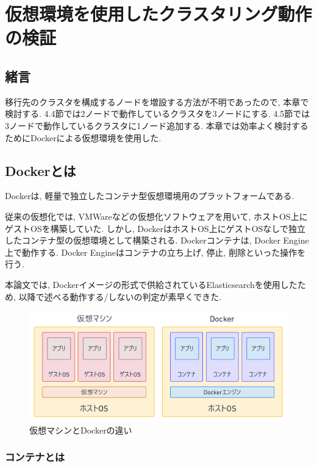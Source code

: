 \chapter{仮想環境を使用したクラスタリング動作の検証}
\label{chap:fourth}

\section{緒言}
移行先のクラスタを構成するノードを増設する方法が不明であったので, 本章で検討する. 4.4節では2ノードで動作しているクラスタを3ノードにする. 4.5節では3ノードで動作しているクラスタに1ノード追加する. 本章では効率よく検討するためにDockerによる仮想環境を使用した.

\section{Dockerとは}
Dockerは, 軽量で独立したコンテナ型仮想環境用のプラットフォームである\cite {4}.

従来の仮想化では, VMWare\cite {5}などの仮想化ソフトウェアを用いて, ホストOS上にゲストOSを構築していた.
しかし, DockerはホストOS上にゲストOSなしで独立したコンテナ型の仮想環境として構築される.
Dockerコンテナは, Docker Engine上で動作する. Docker Engineはコンテナの立ち上げ, 停止, 削除といった操作を行う.

本論文では, Dockerイメージの形式で供給されているElasticsearchを使用したため, 以降で述べる動作する/しないの判定が素早くできた.

\begin{figure}[H]
  \begin{center}
    \includegraphics[width=140mm]{sotu/figure/docker-vmware.png}
    \caption{仮想マシンとDockerの違い}
    \label{4-p1}
  \end{center}
\end{figure}

\subsection{コンテナとは}

